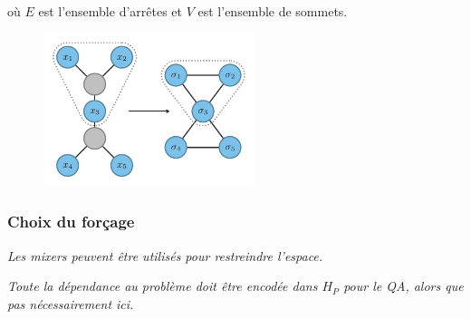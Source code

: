 où $E$ est l'ensemble d'arrêtes et $V$ est l'ensemble de sommets.

\begin{figure}[h]
    \centering
    \includegraphics[width=0.55\textwidth]{figures/ising-mapping}
    \caption{}
    \label{fig:transformation-ising}
\end{figure}



\subsubsection{Choix du forçage}

\textcolor{mydarkred}{\textit{Les mixers peuvent être utilisés pour restreindre l'espace.}}


\textcolor{mydarkred}{\textit{Toute la dépendance au problème doit être encodée dans $H_P$ pour le QA, alors que pas nécessairement ici.}}


